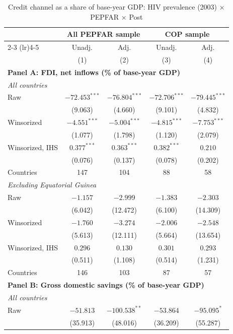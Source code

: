 \begin{table}[htbp]
\centering
\small
\caption{Credit channel as a share of base-year GDP: HIV prevalence (2003) $\times$ PEPFAR $\times$ Post}
\label{tab:crown_mech_gdp0_triple}
\begin{tabular}{lcccc}
\toprule
 & \multicolumn{2}{c}{All PEPFAR sample} & \multicolumn{2}{c}{COP sample} \\
\cmidrule(lr){2-3} \cmidrule(lr){4-5}
 & Unadj. & Adj. & Unadj. & Adj. \\
 & (1) & (2) & (3) & (4) \\
\midrule
\multicolumn{5}{l}{\textbf{Panel A: FDI, net inflows (\% of base-year GDP)}} \\
\multicolumn{5}{l}{\textit{All countries}} \\
Raw & $-72.453^{***}$ & $-76.804^{***}$ & $-72.706^{***}$ & $-79.445^{***}$ \\
 & (9.063) & (4.660) & (9.101) & (4.832) \\
Winsorized & $-4.551^{***}$ & $-5.004^{***}$ & $-4.815^{***}$ & $-7.753^{***}$ \\
 & (1.077) & (1.798) & (1.120) & (2.079) \\
Winsorized, IHS & $0.377^{***}$ & $0.363^{***}$ & $0.382^{***}$ & $0.210$ \\
 & (0.076) & (0.137) & (0.078) & (0.202) \\
Countries & 147 & 104 & 88 & 58 \\
\multicolumn{5}{l}{\textit{Excluding Equatorial Guinea}} \\
Raw & $-1.157$ & $-2.999$ & $-1.383$ & $-2.303$ \\
 & (6.042) & (12.472) & (6.100) & (14.309) \\
Winsorized & $-1.760$ & $-3.274$ & $-2.006$ & $-2.548$ \\
 & (5.613) & (12.111) & (5.664) & (13.654) \\
Winsorized, IHS & $0.296$ & $0.130$ & $0.301$ & $0.293$ \\
 & (0.511) & (1.108) & (0.514) & (1.231) \\
Countries & 146 & 103 & 87 & 57 \\
\midrule
\multicolumn{5}{l}{\textbf{Panel B: Gross domestic savings (\% of base-year GDP)}} \\
\multicolumn{5}{l}{\textit{All countries}} \\
Raw & $-51.813$ & $-100.538^{**}$ & $-53.864$ & $-95.095^{*}$ \\
 & (35.913) & (48.016) & (36.209) & (55.287) \\

\end{tabular}
\end{table}
